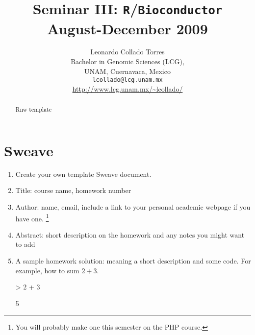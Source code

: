 \documentclass[letterpaper,12pt]{article}
\title{\textbf{Seminar III: \texttt{R}/\texttt{Bioconductor}\\ \small August-December 2009}}
\author{Leonardo Collado Torres\\[1em]Bachelor in Genomic Sciences (LCG),\\ UNAM, Cuernavaca, Mexico\\[1em]\texttt{lcollado@lcg.unam.mx}\\[1em]\url{http://www.lcg.unam.mx/~lcollado/}}
\begin{document}
\maketitle

\medskip
\begin{abstract}
Rnw template
\end{abstract}

\section{Sweave}
  \begin{enumerate}
  \item Create your own template Sweave document.
  \item Title: course name, homework number
  \item Author: name, email, include a link to your personal academic webpage if you have one. \footnote{You will probably make one this semester on the PHP course.}
  \item Abstract: short description on the homework and any notes you might want to add
  \item A sample homework solution: meaning a short description and some code. For example, how to sum $2 + 3$.
\begin{Schunk}
\begin{Sinput}
> 2 + 3
\end{Sinput}
\begin{Soutput}
[1] 5
\end{Soutput}
\end{Schunk}
  \end{enumerate}
  
\end{document}
